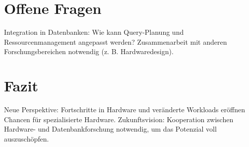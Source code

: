\documentclass[10pt,a4paper]{article}
\begin{document}
\section{Offene Fragen}

Integration in Datenbanken:
Wie kann Query-Planung und Ressourcenmanagement angepasst werden?
Zusammenarbeit mit anderen Forschungsbereichen notwendig (z. B. Hardwaredesign).

\section{Fazit}

Neue Perspektive:
Fortschritte in Hardware und veränderte Workloads eröffnen Chancen für spezialisierte Hardware.
Zukunftsvision:
Kooperation zwischen Hardware- und Datenbankforschung notwendig, um das Potenzial voll auszuschöpfen.
\end{document}
